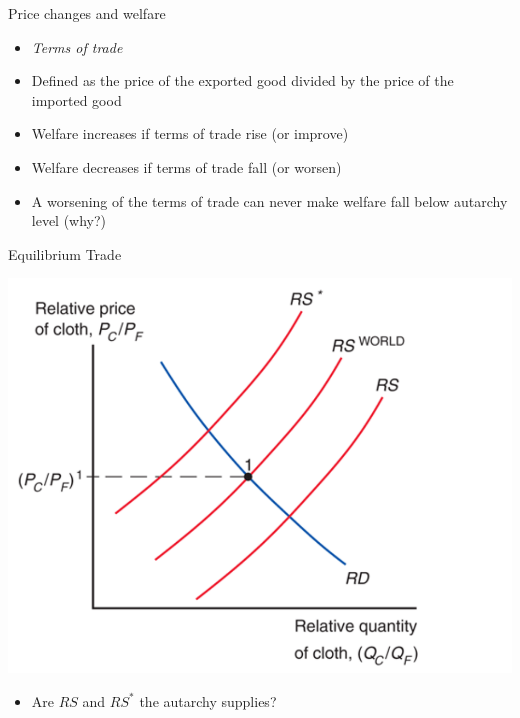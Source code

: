 \documentclass[ignorenonframetext,]{beamer}
\begin{document}
\begin{frame}{Price changes and welfare}

    \begin{itemize}
        \item \emph{Terms of trade}
        \item Defined as the price of the exported good divided by the price of the imported good
        \item Welfare increases if terms of trade rise (or improve)
        \item Welfare decreases if terms of trade fall (or worsen)
        \item A worsening of the terms of trade can never make welfare fall below autarchy level (why?)
    \end{itemize}

\end{frame}

\begin{frame}{Equilibrium Trade}

    \includegraphics[scale=0.25]{rs_world.png}
    \begin{itemize}
        \item Are $RS$ and $RS^*$ the autarchy supplies?
    \end{itemize}

\end{frame}
\end{document}
